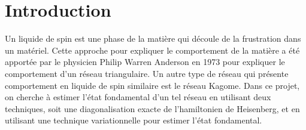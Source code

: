 \documentclass[../main.tex]{subfiles}
\begin{document}
  \section*{Introduction}
  Un liquide de spin est une phase de la matière qui découle de la frustration
  dans un matériel. Cette approche pour expliquer le comportement de la matière
  a été apportée par le physicien Philip Warren Anderson en 1973 pour expliquer
  le comportement d'un réseau triangulaire. Un autre type de réseau qui
  présente comportement en liquide de spin similaire est le réseau Kagome. Dans
  ce projet, on cherche à estimer l'état fondamental d'un tel réseau en utilisant
  deux techniques, soit une diagonalisation exacte de l'hamiltonien de
  Heisenberg, et en utilisant une technique variationnelle pour estimer l'état
  fondamental.
\end{document}
